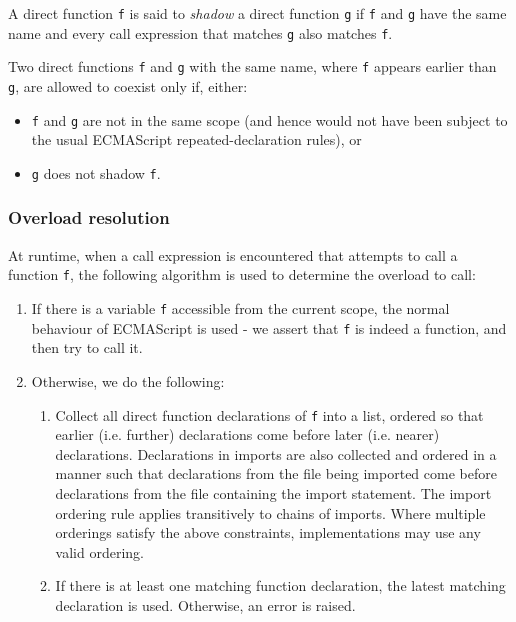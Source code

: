 A direct function \lstinline{f} is said to \textit{shadow} a direct function \lstinline{g} if \lstinline{f} and \lstinline{g} have the same name and every call expression that matches \lstinline{g} also matches \lstinline{f}.

Two direct functions \lstinline{f} and \lstinline{g} with the same name, where \lstinline{f} appears earlier than \lstinline{g}, are allowed to coexist only if, either:

\begin{itemize}

\item \lstinline{f} and \lstinline{g} are not in the same scope (and hence would not have been subject to the usual ECMAScript repeated-declaration rules), or

\item \lstinline{g} does not shadow \lstinline{f}.

\end{itemize}

\subsubsection*{Overload resolution}

At runtime, when a call expression is encountered that attempts to call a function \lstinline{f}, the following algorithm is used to determine the overload to call:

\begin{enumerate}

\item If there is a variable \lstinline{f} accessible from the current scope, the normal behaviour of ECMAScript is used - we assert that \lstinline{f} is indeed a function, and then try to call it.

\item Otherwise, we do the following:

\begin{enumerate}

\item Collect all direct function declarations of \lstinline{f} into a list, ordered so that earlier (i.e. further) declarations come before later (i.e. nearer) declarations.  Declarations in imports are also collected and ordered in a manner such that declarations from the file being imported come before declarations from the file containing the import statement.  The import ordering rule applies transitively to chains of imports.  Where multiple orderings satisfy the above constraints, implementations may use any valid ordering.

\item If there is at least one matching function declaration, the latest matching declaration is used.  Otherwise, an error is raised.

\end{enumerate}

\end{enumerate}

